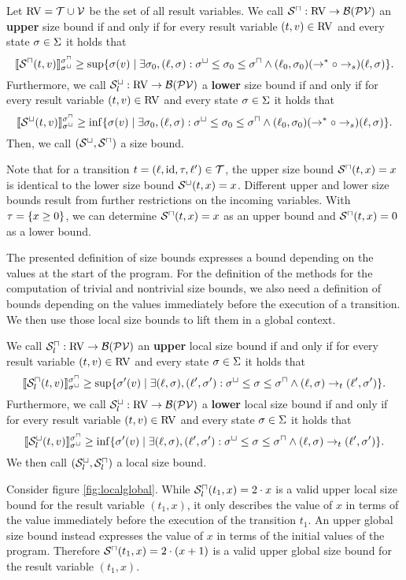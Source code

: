 \begin{definition}
  Let $\text{RV} = \mathcal{T} \cup \mathcal{V}$ be the set of all result variables.
  We call ${\mathcal{S}^\sqcap}: \text{RV} \rightarrow \mathcal{B}(\mathcal{PV})$ an \textbf{upper} size bound if and only if for every result variable $(t, v) \in \text{RV}$ and every state $\sigma \in \Sigma$ it holds that
  \[ \llbracket {\mathcal{S}^\sqcap}(t, v) \rrbracket_{{\sigma^\sqcup}}^{{\sigma^\sqcap}} \geq \sup \lbrace  \sigma(v) \mid \exists \sigma_0, (\ell, \sigma): \sigma^\sqcup \leq \sigma_0 \leq \sigma^\sqcap \wedge (\ell_0, \sigma_0) (\rightarrow^* \circ \rightarrow_s) (\ell, \sigma) \rbrace. \]
  Furthermore, we call ${\mathcal{S}^\sqcup_l}: \text{RV} \rightarrow \mathcal{B}(\mathcal{PV})$ a \textbf{lower} size bound if and only if for every result variable $(t, v) \in \text{RV}$ and every state $\sigma \in \Sigma$ it holds that
  \[ \llbracket {\mathcal{S}^\sqcup}(t, v) \rrbracket_{{\sigma^\sqcup}}^{{\sigma^\sqcap}} \geq \inf \lbrace  \sigma(v) \mid \exists \sigma_0, (\ell, \sigma): \sigma^\sqcup \leq \sigma_0 \leq \sigma^\sqcap \wedge (\ell_0, \sigma_0) (\rightarrow^* \circ \rightarrow_s) (\ell, \sigma) \rbrace. \]
  Then, we call ${({\mathcal{S}^\sqcup}, {\mathcal{S}^\sqcap})}$ a size bound.
\end{definition}

Note that for a transition $t = (\ell,\text{id},\tau,\ell') \in \mathcal{T}$, the upper size bound ${\mathcal{S}^\sqcap}(t,x) = x$ is identical to the lower size bound ${\mathcal{S}^\sqcup}(t,x) = x$.
Different upper and lower size bounds result from further restrictions on the incoming variables.
With $\tau = \lbrace x \geq 0 \rbrace$, we can determine ${\mathcal{S}^\sqcap}(t,x) = x$ as an upper bound and ${\mathcal{S}^\sqcap}(t,x) = 0$ as a lower bound.

The presented definition of size bounds expresses a bound depending on the values at the start of the program.
For the definition of the methods for the computation of trivial and nontrivial size bounds, we also need a definition of bounds depending on the values immediately before the execution of a transition.
We then use those local size bounds to lift them in a global context.

\begin{definition}
  We call ${\mathcal{S}^\sqcap_l}: \text{RV} \rightarrow \mathcal{B}(\mathcal{PV})$ an \textbf{upper} local size bound if and only if for every result variable $(t, v) \in \text{RV}$ and every state $\sigma \in \Sigma$ it holds that
  \[ \llbracket {\mathcal{S}^\sqcap_l}(t, v) \rrbracket_{{\sigma^\sqcup}}^{{\sigma^\sqcap}} \geq \sup \lbrace \sigma'(v) \mid \exists (\ell, \sigma), (\ell', \sigma'): \sigma^\sqcup \leq \sigma \leq \sigma^\sqcap \wedge (\ell, \sigma) \rightarrow_t (\ell', \sigma') \rbrace. \]
  Furthermore, we call ${\mathcal{S}^\sqcup_l}: \text{RV} \rightarrow \mathcal{B}(\mathcal{PV})$ a \textbf{lower} local size bound if and only if for every result variable $(t, v) \in \text{RV}$ and every state $\sigma \in \Sigma$ it holds that
  \[ \llbracket {\mathcal{S}^\sqcup_l}(t, v) \rrbracket_{{\sigma^\sqcup}}^{{\sigma^\sqcap}} \geq \inf \lbrace \sigma'(v) \mid \exists (\ell, \sigma), (\ell', \sigma'): \sigma^\sqcup \leq \sigma \leq \sigma^\sqcap \wedge (\ell, \sigma) \rightarrow_t (\ell', \sigma') \rbrace. \]
  We then call ${({\mathcal{S}^\sqcup_l}, {\mathcal{S}^\sqcap_l})}$ a local size bound.
\end{definition}



Consider figure \ref{fig:localglobal}.
While ${\mathcal{S}^\sqcap_l}(t_1, x) = 2 \cdot x$ is a valid upper local size bound for the result variable $(t_1, x)$, it only describes the value of $x$ in terms of the value immediately before the execution of the transition $t_1$.
An upper global size bound instead expresses the value of $x$ in terms of the initial values of the program.
Therefore ${\mathcal{S}^\sqcap}(t_1, x) = 2 \cdot (x + 1)$ is a valid upper global size bound for the result variable $(t_1, x)$.

